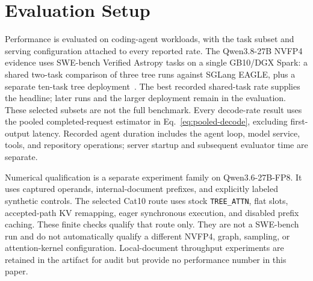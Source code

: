 \documentclass[conference]{IEEEtran}
\begin{document}
\section{Evaluation Setup}
\label{sec:protocol}
Performance is evaluated on coding-agent workloads, with the task subset and serving configuration attached to every reported rate. The Qwen3.8-27B NVFP4 evidence uses SWE-bench Verified Astropy tasks on a single GB10/DGX Spark: a shared two-task comparison of three tree runs against SGLang EAGLE, plus a separate ten-task tree deployment~\cite{lumo2026archive,jimenez2024swe}. The best recorded shared-task rate supplies the headline; later runs and the larger deployment remain in the evaluation. These selected subsets are not the full benchmark. Every decode-rate result uses the pooled completed-request estimator in Eq.~\ref{eq:pooled-decode}, excluding first-output latency. Recorded agent duration includes the agent loop, model service, tools, and repository operations; server startup and subsequent evaluator time are separate.

Numerical qualification is a separate experiment family on Qwen3.6-27B-FP8. It uses captured operands, internal-document prefixes, and explicitly labeled synthetic controls. The selected Cat10 route uses stock \texttt{TREE\_ATTN}, flat slots, accepted-path KV remapping, eager synchronous execution, and disabled prefix caching. These finite checks qualify that route only. They are not a SWE-bench run and do not automatically qualify a different NVFP4, graph, sampling, or attention-kernel configuration. Local-document throughput experiments are retained in the artifact for audit but provide no performance number in this paper.
\end{document}
